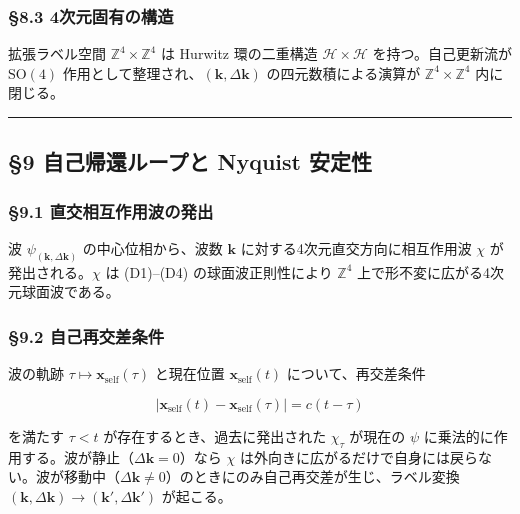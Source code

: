 \documentclass[
  a4paper,11pt]{ltjsarticle}
\theoremstyle{definition}
\theoremstyle{remark}
\begin{document}
\subsubsection{§8.3
4次元固有の構造}\label{ux6b21ux5143ux56faux6709ux306eux69cbux9020}

拡張ラベル空間 \(\mathbb{Z}^4 \times \mathbb{Z}^4\) は Hurwitz
環の二重構造 \(\mathcal{H} \times \mathcal{H}\) を持つ。自己更新流が
\(\mathrm{SO}(4)\)
作用として整理され、\((\mathbf{k}, \Delta\mathbf{k})\)
の四元数積による演算が \(\mathbb{Z}^4 \times \mathbb{Z}^4\) 内に閉じる。

\begin{center}\rule{0.5\linewidth}{0.5pt}\end{center}

\subsection{§9 自己帰還ループと Nyquist
安定性}\label{ux81eaux5df1ux5e30ux9084ux30ebux30fcux30d7ux3068-nyquist-ux5b89ux5b9aux6027}

\subsubsection{§9.1
直交相互作用波の発出}\label{ux76f4ux4ea4ux76f8ux4e92ux4f5cux7528ux6ce2ux306eux767aux51fa}

波 \(\psi_{(\mathbf{k}, \Delta\mathbf{k})}\) の中心位相から、波数
\(\mathbf{k}\) に対する4次元直交方向に相互作用波 \(\chi\)
が発出される。\(\chi\) は (D1)--(D4) の球面波正則性により
\(\mathbb{Z}^4\) 上で形不変に広がる4次元球面波である。

\subsubsection{§9.2
自己再交差条件}\label{ux81eaux5df1ux518dux4ea4ux5deeux6761ux4ef6}

波の軌跡 \(\tau \mapsto \mathbf{x}_{\mathrm{self}}(\tau)\) と現在位置
\(\mathbf{x}_{\mathrm{self}}(t)\) について、再交差条件

\[|\mathbf{x}_{\mathrm{self}}(t) - \mathbf{x}_{\mathrm{self}}(\tau)| = c(t - \tau)\]

を満たす \(\tau < t\) が存在するとき、過去に発出された \(\chi_\tau\)
が現在の \(\psi\)
に乗法的に作用する。波が静止（\(\Delta\mathbf{k} = 0\)）なら \(\chi\)
は外向きに広がるだけで自身には戻らない。波が移動中（\(\Delta\mathbf{k} \neq 0\)）のときにのみ自己再交差が生じ、ラベル変換
\((\mathbf{k}, \Delta\mathbf{k}) \to (\mathbf{k}', \Delta\mathbf{k}')\)
が起こる。
\end{document}
